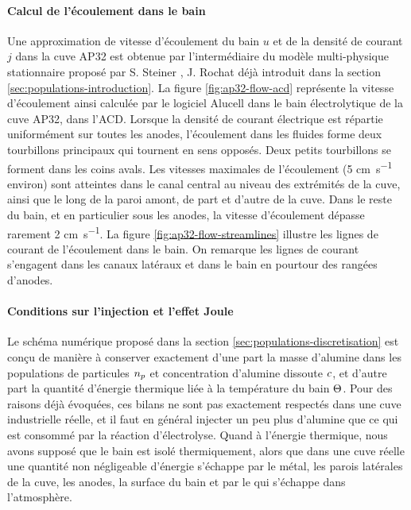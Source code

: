 \paragraph{Calcul de l'écoulement dans le bain} Une approximation de vitesse
d'écoulement du bain $u$ et de la densité de courant $j$ dans la cuve
AP32 est obtenue par l'intermédiaire du modèle multi-physique
stationnaire proposé par S. Steiner \cite{Steiner2009}, J. Rochat
\cite{Rochat2016} déjà introduit dans la section
\ref{sec:populations-introduction}. La figure \ref{fig:ap32-flow-acd}
représente la vitesse d'écoulement ainsi calculée par le logiciel
Alucell dans le bain électrolytique de la cuve AP32, dans
l'ACD. Lorsque la densité de courant électrique est répartie
uniformément sur toutes les anodes, l'écoulement dans les fluides
forme deux tourbillons principaux qui tournent en sens opposés. Deux
petits tourbillons se forment dans les coins avals. Les vitesses
maximales de l'écoulement (\num{5} \si{\centi\meter\per\second}
environ) sont atteintes dans le canal central au niveau des extrémités
de la cuve, ainsi que le long de la paroi amont, de part et d'autre de
la cuve. Dans le reste du bain, et en particulier sous les anodes, la
vitesse d'écoulement dépasse rarement \num{2}
\si{\centi\meter\per\second}. La figure
\ref{fig:ap32-flow-streamlines} illustre les lignes de courant de
l'écoulement dans le bain. On remarque les lignes de courant
s'engagent dans les canaux latéraux et dans le bain en
pourtour des rangées d'anodes.

\paragraph{Conditions sur l'injection et l'effet Joule}
Le schéma numérique proposé dans la section
\ref{sec:populations-discretisation} est conçu de manière à conserver
exactement d'une part la masse d'alumine dans les populations de
particules $n_p$ et concentration d'alumine dissoute
$c$, et d'autre part la quantité d'énergie thermique liée
à la température du bain $\Theta$. Pour des raisons déjà
évoquées, ces bilans ne sont pas exactement respectés dans une cuve
industrielle réelle, et il faut en général injecter un peu plus d'alumine
que ce qui est consommé par la réaction d'électrolyse. Quand à
l'énergie thermique, nous avons supposé que le bain est isolé
thermiquement, alors que dans une cuve réelle une quantité non
négligeable d'énergie s'échappe par le métal, les parois latérales de
la cuve, les anodes, la surface du bain et par le  qui
s'échappe dans l'atmosphère.

